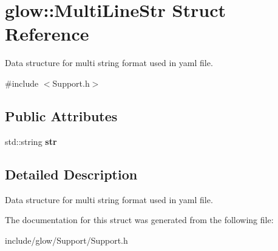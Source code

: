 \hypertarget{structglow_1_1_multi_line_str}{}\section{glow\+:\+:Multi\+Line\+Str Struct Reference}
\label{structglow_1_1_multi_line_str}


Data structure for multi string format used in yaml file.  




{\ttfamily \#include $<$Support.\+h$>$}

\subsection*{Public Attributes}
\begin{DoxyCompactItemize}
\item 
\mbox{\label{structglow_1_1_multi_line_str_a7d39d2163c7c2768aaabf5e658a13b86}} 
std\+::string {\bfseries str}
\end{DoxyCompactItemize}


\subsection{Detailed Description}
Data structure for multi string format used in yaml file. 

The documentation for this struct was generated from the following file\+:\begin{DoxyCompactItemize}
\item 
include/glow/\+Support/Support.\+h\end{DoxyCompactItemize}
